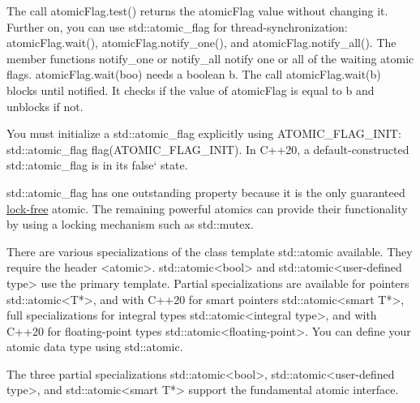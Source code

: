 The call atomicFlag.test() returns the atomicFlag value without changing it. Further on, you can use std::atomic\_flag for thread-synchronization: atomicFlag.wait(), atomicFlag.notify\_one(), and atomicFlag.notify\_all(). The member functions notify\_one or notify\_all notify one or all of the waiting atomic flags. atomicFlag.wait(boo) needs a boolean b. The call atomicFlag.wait(b) blocks until notified. It checks if the value of atomicFlag is equal to b and unblocks if not.

You must initialize a std::atomic\_flag explicitly using ATOMIC\_FLAG\_INIT: std::atomic\_flag flag(ATOMIC\_FLAG\_INIT). In C++20, a default-constructed std::atomic\_flag is in its false‘ state.

std::atomic\_flag has one outstanding property because it is the only guaranteed \href{https://en.wikipedia.org/wiki/Non-blocking_algorithm}{lock-free} atomic. The remaining powerful atomics can provide their functionality by using a locking mechanism such as std::mutex.


There are various specializations of the class template std::atomic available. They require the header <atomic>. std::atomic<bool> and std::atomic<user-defined type> use the primary template. Partial specializations are available for pointers std::atomic<T*>, and with C++20 for smart pointers std::atomic<smart T*>, full specializations for integral types std::atomic<integral type>, and with C++20 for floating-point types std::atomic<floating-point>. You can define your atomic data type using std::atomic.


The three partial specializations std::atomic<bool>, std::atomic<user-defined type>, and std::atomic<smart T*> support the fundamental atomic interface.

